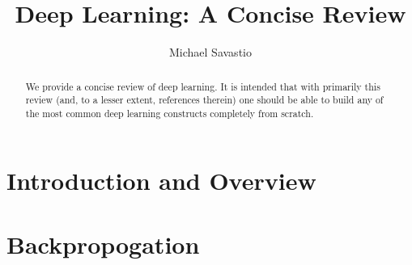 \documentclass{article}
\title{Deep Learning: A Concise Review}
\author{Michael Savastio}
\date{}
\begin{document}
\maketitle
\begin{abstract}
    We provide a concise review of deep learning.  It is intended that with primarily this review (and, to a lesser extent, references therein) one should be
    able to build any of the most common deep learning constructs completely from scratch.
\end{abstract}

\section{Introduction and Overview}


\section{Backpropogation}




\end{document}
